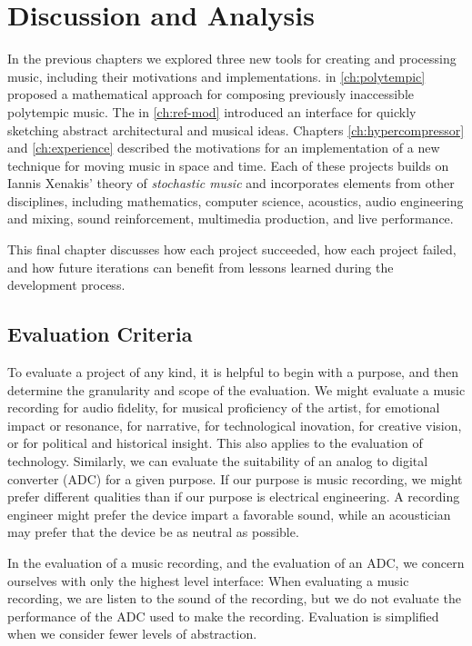 \clearpage
\chapter{Discussion and Analysis}
\label{ch:analysis}
In the previous chapters we explored three new tools for creating and
processing music, including their motivations and implementations.
\polytempic in \autoref{ch:polytempic} proposed a mathematical
approach for composing previously inaccessible polytempic music. The
 in \autoref{ch:ref-mod} introduced an interface for quickly
sketching abstract architectural and musical ideas.  Chapters
\ref{ch:hypercompressor} and \ref{ch:experience} described the
motivations for an implementation of a new technique for moving music in
space and time. Each of these projects builds on Iannis Xenakis'
theory of \textit{stochastic music} and incorporates elements from
other disciplines, including mathematics, computer science, acoustics,
audio engineering and mixing, sound reinforcement, multimedia
production, and live performance.

This final chapter discusses how each project succeeded, how each
project failed, and how future iterations can benefit from lessons
learned during the development process.

\section{Evaluation Criteria}
\label{sec:eval-criteria}
To evaluate a project of any kind, it is helpful to begin with a
purpose, and then determine the granularity and scope of the
evaluation.\cite{Saltzer2009} We might evaluate a music recording for
audio fidelity, for musical proficiency of the artist, for emotional
impact or resonance, for narrative, for technological inovation, for
creative vision, or for political and historical insight. This also
applies to the evaluation of technology. Similarly, we can evaluate
the suitability of an analog to digital converter (ADC) for a given
purpose. If our purpose is music recording, we might prefer different
qualities than if our purpose is electrical engineering. A recording
engineer might prefer the device impart a favorable sound, while an
acoustician may prefer that the device be as neutral as possible.  

In the evaluation of a music recording, and the evaluation of an ADC,
we concern ourselves with only the highest level interface: When
evaluating a music recording, we are listen to the sound of the
recording, but we do not evaluate the performance of the ADC used to
make the recording. Evaluation is simplified when we consider fewer
levels of abstraction.

